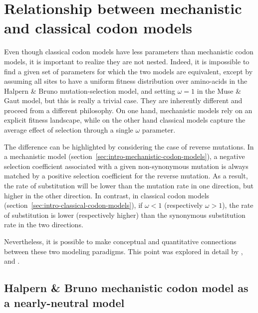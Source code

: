 \section{Relationship between mechanistic and classical codon models}
\label{sec:relationship-between-mechanistic-and-classical-codon-models}

Even though classical codon models have less parameters than mechanistic codon models, it is important to realize they are not nested.
Indeed, it is impossible to find a given set of parameters for which the two models are equivalent, except by assuming all sites to have a uniform fitness distribution over amino-acids in the Halpern \& Bruno mutation-selection model, and setting $\omega = 1$ in the Muse \& Gaut model, but this is really a trivial case.
They are inherently different and proceed from a different philosophy.
On one hand, mechanistic models rely on an explicit fitness landscape, while on the other hand classical models capture the average effect of selection through a single $\omega$ parameter.

The difference can be highlighted by considering the case of reverse mutations.
In a mechanistic model (section~\ref{sec:intro-mechanistic-codon-models}), a negative selection coefficient associated with a given non-synonymous mutation is always matched by a positive selection coefficient for the reverse mutation.
As a result, the rate of substitution will be lower than the mutation rate in one direction, but higher in the other direction.
In contrast, in classical codon models (section~\ref{sec:intro-classical-codon-models}), if $\omega < 1$ (respectively $\omega> 1$), the rate of substitution is lower (respectively higher) than the synonymous substitution rate in the two directions.

Nevertheless, it is possible to make conceptual and quantitative connections between these two modeling paradigms.
This point was explored in detail by \citet{Spielman2015}, \citet{DosReis2015} and \citet{Jones2016}.

\subsection{Halpern \& Bruno mechanistic codon model as a nearly-neutral model}
\label{subsec:HB-formalism-nearly-neutral-model}

